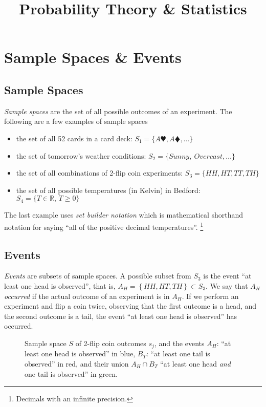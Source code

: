 \documentclass[11pt,a4paper]{article}
\title{Probability Theory \& Statistics}
\begin{document}
\maketitle
\newpage

\section{Sample Spaces \& Events}

\subsection{Sample Spaces}

\emph{Sample spaces} are the set of all possible outcomes of an experiment. 
The following are a few examples of sample spaces

\begin{itemize}
\item 
the set of all 52 cards in a card deck: 
\(S_{1} = \{A\varheartsuit, A\vardiamondsuit,\ldots\}\)
\item 
the set of tomorrow's weather conditions: 
\(S_{2} = \{ Sunny,\ Overcast,\ldots\}\)
\item 
the set of all combinations of 2-flip coin experiments: 
\(S_{3} = \{HH, HT, TT, TH\}\)
\item 
the set of all possible temperatures (in Kelvin) in Bedford: 
\(S_{4} = \{T \in \mathbb{R}, \, T \geq 0\}\)
\end{itemize}

The last example uses \emph{set builder notation} which is mathematical shorthand notation 
for saying ``all of the positive decimal temperatures''.%
\footnote{Decimals with an infinite precision.}

\subsection{Events}

\emph{Events} are subsets of sample spaces.
A possible subset from \(S_{3}\) is the event ``at least one head is observed'', 
that is, \(A_{H} = \left\{HH, HT, TH\right\} \subset S_{3}\). 
We say that \emph{\(A_{H}\) occurred} if the actual outcome 
of an experiment is in \(A_{H}\). 
If we perform an experiment and flip a coin twice, 
observing that the first outcome is a head, 
and the second outcome is a tail, 
the event ``at least one head is observed'' has occurred.

\begin{figure}[h!]
\centering

\caption{Sample space \(S\) of 2-flip coin outcomes \(s_{j}\), 
and the events \(A_{H}\): ``at least one head is observed'' in blue, 
\(B_{T}\): ``at least one tail is observed'' in red,
and their union \(A_{H} \cap B_{T}\) ``at least one head \emph{and} one tail is observed'' in green.}
\label{fig:coinflip}
\end{figure}
\end{document}
